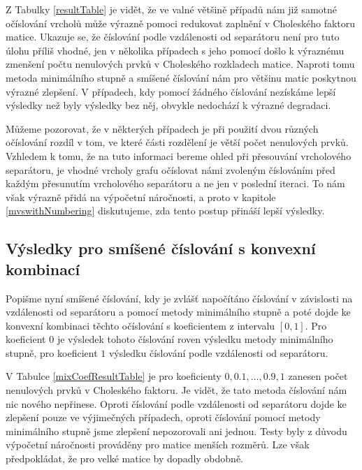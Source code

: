 \documentclass{ctuthesis}
\theoremstyle{plain}
\theoremstyle{definition}
\begin{document}
Z Tabulky \ref{resultTable} je vidět, že ve valné většině případů nám již samotné očíslování vrcholů může výrazně pomoci redukovat zaplnění v Choleského faktoru matice. Ukazuje se, že číslování podle vzdálenosti od separátoru není pro tuto úlohu příliš vhodné, jen v několika případech s jeho pomocí došlo k výraznému zmenšení počtu nenulových prvků v Choleského rozkladech matice. Naproti tomu metoda minimálního stupně a smíšené číslování nám pro většinu matic poskytnou výrazné zlepšení. V případech, kdy pomocí žádného číslování nezískáme lepší výsledky než byly výsledky bez něj, obvykle nedochází k výrazné degradaci.

Můžeme pozorovat, že v některých případech je při použití dvou různých očíslování rozdíl v tom, ve které části rozdělení je větší počet nenulových prvků. Vzhledem k tomu, že na tuto informaci bereme ohled při přesouvání vrcholového separátoru, je vhodné vrcholy grafu očíslovat námi zvoleným číslováním před každým přesunutím vrcholového separátoru a ne jen v poslední iteraci. To nám však výrazně přidá na výpočetní náročnosti, a proto v kapitole \ref{mvswithNumbering} diskutujeme, zda tento postup přináší lepší výsledky.

\subsection{Výsledky pro smíšené číslování s konvexní kombinací}

Popišme nyní smíšené číslování, kdy je zvlášť napočítáno číslování v závislosti na vzdálenosti od separátoru a pomocí metody minimálního stupně a poté dojde ke konvexní kombinaci těchto očíslování s koeficientem z intervalu $[0,1]$. Pro koeficient $0$ je výsledek tohoto číslování roven výsledku metody minimálního stupně, pro koeficient $1$ výsledku číslování podle vzdálenosti od separátoru.

V Tabulce \ref{mixCoefResultTable} je pro koeficienty $0, 0.1,\ldots,0.9, 1$ zanesen počet nenulových prvků v Choleského faktoru. Je vidět, že tato metoda číslování nám nic nového nepřinese. Oproti číslování podle vzdálenosti od separátoru dojde ke zlepšení pouze ve výjimečných případech, oproti číslování pomocí metody minimálního stupně jsme zlepšení nepozorovali ani jednou. Testy byly z důvodu výpočetní náročnosti prováděny pro matice menších rozměrů. Lze však předpokládat, že pro velké matice by dopadly obdobně.
\end{document}
